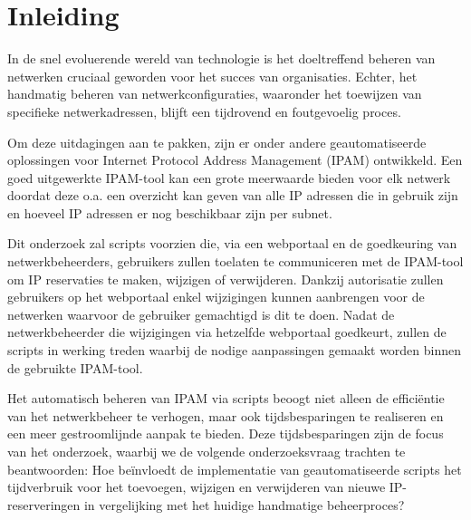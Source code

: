 


% 
\graphicspath{ {../voorstel/img/} }

\section{Inleiding}%
\label{sec:inleiding}
In de snel evoluerende wereld van technologie is het doeltreffend beheren van netwerken cruciaal geworden voor het succes van organisaties. Echter, het handmatig beheren van netwerkconfiguraties, waaronder het toewijzen van specifieke netwerkadressen, blijft een tijdrovend en foutgevoelig proces.

Om deze uitdagingen aan te pakken, zijn er onder andere geautomatiseerde oplossingen voor Internet Protocol Address Management (IPAM) ontwikkeld. Een goed uitgewerkte IPAM-tool kan een grote meerwaarde bieden voor elk netwerk doordat deze o.a. een overzicht kan geven van alle IP adressen die in gebruik zijn en hoeveel IP adressen er nog beschikbaar zijn per subnet.

Dit onderzoek zal scripts voorzien die, via een webportaal en de goedkeuring van netwerkbeheerders, gebruikers zullen toelaten te communiceren met de IPAM-tool om IP reservaties te maken, wijzigen of verwijderen. Dankzij autorisatie zullen gebruikers op het webportaal enkel wijzigingen kunnen aanbrengen voor de netwerken waarvoor de gebruiker gemachtigd is dit te doen. Nadat de netwerkbeheerder die wijzigingen via hetzelfde webportaal goedkeurt, zullen de scripts in werking treden waarbij de nodige aanpassingen gemaakt worden binnen de gebruikte IPAM-tool.

Het automatisch beheren van IPAM via scripts beoogt niet alleen de efficiëntie van het netwerkbeheer te verhogen, maar ook tijdsbesparingen te realiseren en een meer gestroomlijnde aanpak te bieden. Deze tijdsbesparingen zijn de focus van het onderzoek, waarbij we de volgende onderzoeksvraag trachten te beantwoorden: Hoe beïnvloedt de implementatie van geautomatiseerde scripts het tijdverbruik voor het toevoegen, wijzigen en verwijderen van nieuwe IP-reserveringen in vergelijking met het huidige handmatige beheerproces?

